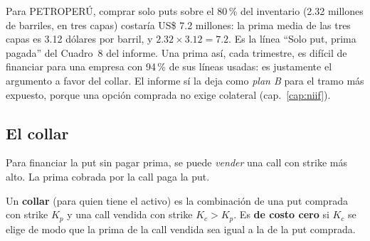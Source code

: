 
\begin{informe}
Para PETROPERÚ, comprar solo puts sobre el 80\,\% del inventario (2.32 millones de barriles, en tres capas) costaría US\$ 7.2 millones: la prima media de las tres capas es 3.12 dólares por barril, y $2.32\times3.12=7.2$. Es la línea \enquote{Solo put, prima pagada} del Cuadro~8 del informe. Una prima así, cada trimestre, es difícil de financiar para una empresa con 94\,\% de sus líneas usadas: es justamente el argumento a favor del collar. El informe sí la deja como \emph{plan B} para el tramo más expuesto, porque una opción comprada no exige colateral (cap.~\ref{cap:niif}).
\end{informe}

\subsection{El collar}

Para financiar la put sin pagar prima, se puede \emph{vender} una call con strike más alto. La prima cobrada por la call paga la put.

\begin{definicion}
Un \textbf{collar} (para quien tiene el activo) es la combinación de una put comprada con strike $K_p$ y una call vendida con strike $K_c>K_p$. Es \textbf{de costo cero} si $K_c$ se elige de modo que la prima de la call vendida sea igual a la de la put comprada.
\end{definicion}


